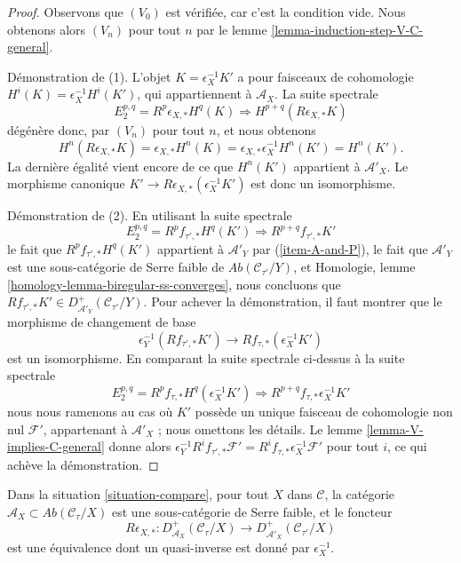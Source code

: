\begin{proof}
Observons que $(V_0)$ est vérifiée, car c'est la condition vide.
Nous obtenons alors $(V_n)$ pour tout $n$ par le
lemme \ref{lemma-induction-step-V-C-general}.

\medskip\noindent
Démonstration de (1). L'objet $K = \epsilon_X^{-1}K'$ a pour faisceaux de
cohomologie $H^i(K) = \epsilon_X^{-1}H^i(K')$, qui appartiennent à
$\mathcal{A}_X$. La suite spectrale
$$
E_2^{p, q} = R^p\epsilon_{X, *} H^q(K) \Rightarrow
H^{p + q}(R\epsilon_{X, *}K)
$$
dégénère donc, par $(V_n)$ pour tout $n$, et nous obtenons
$$
H^n(R\epsilon_{X, *}K) = \epsilon_{X, *}H^n(K) =
\epsilon_{X, *}\epsilon_X^{-1}H^n(K') = H^n(K').
$$
La dernière égalité vient encore de ce que $H^n(K')$ appartient à
$\mathcal{A}'_X$. Le morphisme canonique
$K' \to R\epsilon_{X, *}(\epsilon_X^{-1}K')$ est donc un isomorphisme.

\medskip\noindent
Démonstration de (2). En utilisant la suite spectrale
$$
E_2^{p, q} = R^pf_{\tau', *}H^q(K') \Rightarrow R^{p + q}f_{\tau', *}K'
$$
le fait que $R^pf_{\tau', *}H^q(K')$ appartient à
$\mathcal{A}'_Y$ par (\ref{item-A-and-P}), le fait que $\mathcal{A}'_Y$ est
une sous-catégorie de Serre faible de
$\textit{Ab}(\mathcal{C}_{\tau'}/Y)$, et Homologie, lemme
\ref{homology-lemma-biregular-ss-converges}, nous concluons que
$Rf_{\tau', *}K' \in D^+_{\mathcal{A}'_Y}(\mathcal{C}_{\tau'}/Y)$.
Pour achever la démonstration, il faut montrer que le morphisme de changement
de base
$$
\epsilon_Y^{-1}(Rf_{\tau', *}K')
\longrightarrow
Rf_{\tau, *}(\epsilon_X^{-1}K')
$$
est un isomorphisme. En comparant la suite spectrale ci-dessus à la suite
spectrale
$$
E_2^{p, q} = R^pf_{\tau, *}H^q(\epsilon_X^{-1}K')
\Rightarrow R^{p + q}f_{\tau, *}\epsilon_X^{-1}K'
$$
nous nous ramenons au cas où $K'$ possède un unique faisceau de cohomologie
non nul $\mathcal{F}'$, appartenant à $\mathcal{A}'_X$ ; nous omettons les
détails. Le lemme \ref{lemma-V-implies-C-general} donne alors
$\epsilon_Y^{-1}R^if_{\tau', *}\mathcal{F}' =
R^if_{\tau, *}\epsilon_X^{-1}\mathcal{F}'$ pour tout $i$,
ce qui achève la démonstration.
\end{proof}

\begin{lemma}
\label{lemma-cohomological-descent-general}
Dans la situation \ref{situation-compare}, pour tout $X$ dans
$\mathcal{C}$, la catégorie
$\mathcal{A}_X \subset \textit{Ab}(\mathcal{C}_\tau/X)$
est une sous-catégorie de Serre faible, et le foncteur
$$
R\epsilon_{X, *} :
D^+_{\mathcal{A}_X}(\mathcal{C}_\tau/X)
\longrightarrow
D^+_{\mathcal{A}'_X}(\mathcal{C}_{\tau'}/X)
$$
est une équivalence dont un quasi-inverse est donné par $\epsilon_X^{-1}$.
\end{lemma}

